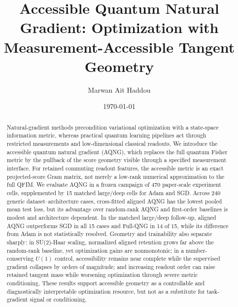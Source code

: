 \documentclass[aps,pra,reprint,superscriptaddress,nofootinbib]{revtex4-2}
\begin{document}
\title{Accessible Quantum Natural Gradient: Optimization with Measurement-Accessible Tangent Geometry}
\author{Marwan Ait Haddou}
\date{\today}

\begin{abstract}
Natural-gradient methods precondition variational optimization with a state-space information metric, whereas practical quantum learning pipelines act through restricted measurements and low-dimensional classical readouts. We introduce the accessible quantum natural gradient (AQNG), which replaces the full quantum Fisher metric by the pullback of the score geometry visible through a specified measurement interface. For retained commuting readout features, the accessible metric is an exact projected-score Gram matrix, not merely a low-rank numerical approximation to the full QFIM. We evaluate AQNG in a frozen campaign of 470 paper-scale experiment cells, supplemented by 15 matched large/deep cells for Adam and SGD. Across 240 generic dataset--architecture cases, cross-fitted aligned AQNG has the lowest pooled mean test loss, but its advantage over random-rank AQNG and first-order baselines is modest and architecture dependent. In the matched large/deep follow-up, aligned AQNG outperforms SGD in all 15 cases and Full-QNG in 14 of 15, while its difference from Adam is not statistically resolved. Geometry and trainability also separate sharply: in SU(2)-Haar scaling, normalized aligned retention grows far above the random-rank baseline, yet optimization gains are nonmonotonic; in a number-conserving $U(1)$ control, accessibility remains near complete while the supervised gradient collapses by orders of magnitude; and increasing readout order can raise retained tangent mass while worsening optimization through severe metric conditioning. These results support accessible geometry as a controllable and diagnostically interpretable optimization resource, but not as a substitute for task-gradient signal or conditioning.
\end{abstract}

\maketitle









\appendix




\end{document}
